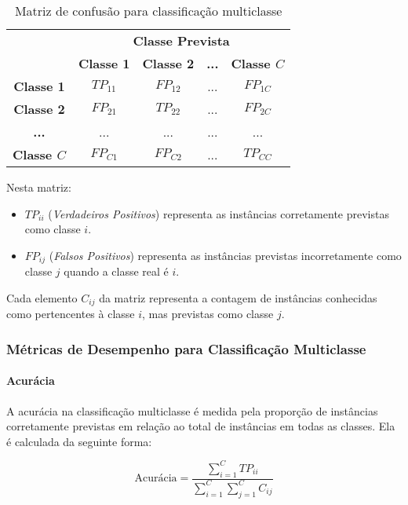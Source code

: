 \begin{table}[h]
\centering
\caption{Matriz de confusão para classificação multiclasse}
\label{tab:confusion_matrix_multiclass}
\begin{tabular}{c|c|c|c|c}
\multicolumn{1}{c}{} & \multicolumn{4}{c}{\textbf{Classe Prevista}} \\ \cline{2-5} 
\multicolumn{1}{c|}{} & \textbf{Classe 1} & \textbf{Classe 2} & \textbf{...} & \textbf{Classe \(C\)} \\ \hline
\textbf{Classe 1} & \(TP_{11}\) & \(FP_{12}\) & ... & \(FP_{1C}\) \\ \hline
\textbf{Classe 2} & \(FP_{21}\) & \(TP_{22}\) & ... & \(FP_{2C}\) \\ \hline
\textbf{...} & ... & ... & ... & ... \\ \hline
\textbf{Classe \(C\)} & \(FP_{C1}\) & \(FP_{C2}\) & ... & \(TP_{CC}\) \\ \hline
\end{tabular}
\end{table}

Nesta matriz:
\begin{itemize}
    \item \(TP_{ii}\) (\textit{Verdadeiros Positivos}) representa as instâncias corretamente previstas como classe \(i\).
    \item \(FP_{ij}\) (\textit{Falsos Positivos}) representa as instâncias previstas incorretamente como classe \(j\) quando a classe real é \(i\).
\end{itemize}

Cada elemento \(C_{ij}\) da matriz representa a contagem de instâncias conhecidas como pertencentes à classe \(i\), mas previstas como classe \(j\).

\subsubsection{Métricas de Desempenho para Classificação Multiclasse}

\paragraph{Acurácia}

A acurácia na classificação multiclasse é medida pela proporção de instâncias corretamente previstas em relação ao total de instâncias em todas as classes. Ela é calculada da seguinte forma:

\[
\text{Acurácia} = \frac{\sum_{i=1}^{C} TP_{ii}}{\sum_{i=1}^{C} \sum_{j=1}^{C} C_{ij}}
\]

